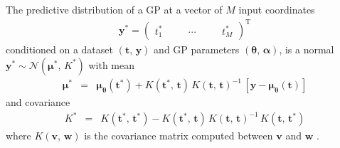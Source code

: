 \documentclass[manuscript, letterpaper]{aastex6}
\newcommand{\eqlabel}[1]{\label{eq:#1}}
\newcommand{\T}{\ensuremath{\mathrm{T}}}
\newcommand{\bvec}[1]{{\ensuremath{\boldsymbol{#1}}}}
\begin{document}
{The predictive distribution of a GP at a vector of $M$ input coordinates
\begin{eqnarray}
    \bvec{y}^* = \left(\begin{array}{ccccc}
            t_1^*\quad &  & \cdots\quad &  & t_M^*
        \end{array}\right)^\T
\end{eqnarray}
conditioned on a dataset $(\bvec{t},\,\bvec{y})$ and GP
parameters $(\bvec{\theta},\,\bvec{\alpha})$, is a normal $\bvec{y}^* \sim
    \mathcal{N}(\bvec{\mu}^*,\,K^*)$ with mean
\begin{eqnarray}\eqlabel{pred-mean}
    \bvec{\mu}^* &=& \bvec{\mu}_\bvec{\theta}(\bvec{t}^*) +
    K(\bvec{t}^*,\,\bvec{t})\,{K(\bvec{t},\,\bvec{t})}^{-1}\,\left[\bvec{y} -
        \bvec{\mu}_\bvec{\theta}(\bvec{t})\right]
\end{eqnarray}
and covariance
\begin{eqnarray}
    K^* &=& K(\bvec{t}^*,\,\bvec{t}^*) -
    K(\bvec{t}^*,\,\bvec{t})\,{K(\bvec{t},\,\bvec{t})}^{-1}\,
    K(\bvec{t},\,\bvec{t}^*)
\end{eqnarray}
where $K(\bvec{v},\,\bvec{w})$ is the covariance matrix computed between
\bvec{v} and \bvec{w} \citep{Rasmussen:2006}.

}
\end{document}
